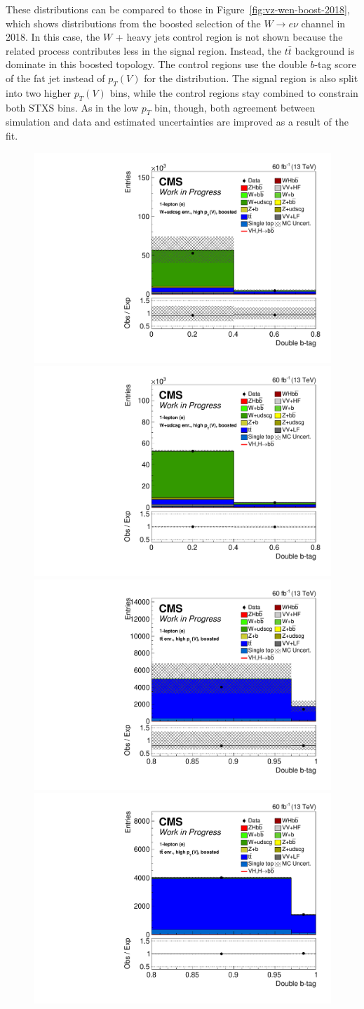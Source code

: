 %
These distributions can be compared to those in Figure~\ref{fig:vz-wen-boost-2018},
which shows distributions from the boosted selection of the $W\rightarrow e\nu$ channel in 2018.
In this case, the $W$ + heavy jets control region is not shown because the related process contributes less
in the signal region.
Instead, the $t\bar{t}$ background is dominate in this boosted
topology. 
The control regions use the double $b$-tag score of the fat jet instead of $p_T(V)$ for the distribution.
The signal region is also split into two higher $p_T(V)$ bins, while the control regions stay combined
to constrain both STXS bins.
As in the low $p_T$ bin, though, both agreement between simulation and data and estimated uncertainties
are improved as a result of the fit.
%
\begin{figure}
  \centering
  \includegraphics[width=0.35\linewidth]{figures/210323_STXS_VZ_unblinded_XbbVZ_8fe9e9cd_postfitplots/plot_shapes_vhbb_Wen_18_13TeV2018_prefit}
  \includegraphics[width=0.35\linewidth]{figures/210323_STXS_VZ_unblinded_XbbVZ_8fe9e9cd_postfitplots/plot_shapes_vhbb_Wen_18_13TeV2018_postfit} \\
  \includegraphics[width=0.35\linewidth]{figures/210323_STXS_VZ_unblinded_XbbVZ_8fe9e9cd_postfitplots/plot_shapes_vhbb_Wen_20_13TeV2018_prefit}
  \includegraphics[width=0.35\linewidth]{figures/210323_STXS_VZ_unblinded_XbbVZ_8fe9e9cd_postfitplots/plot_shapes_vhbb_Wen_20_13TeV2018_postfit} \\

\end{figure}
